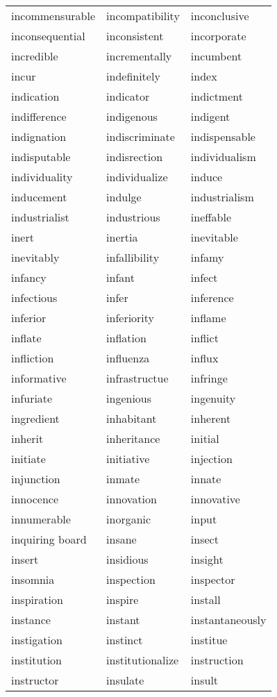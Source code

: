 \documentclass{minimal}
\begin{document}
\begin{longtable}{p{2.7cm}@{\hskip 0.2cm}p{2.7cm}@{\hskip 0.2cm}p{2.7cm}}
incommensurable & incompatibility & inconclusive \\
inconsequential & inconsistent & incorporate \\
incredible & incrementally & incumbent \\
incur & indefinitely & index \\
indication & indicator & indictment \\
indifference & indigenous & indigent \\
indignation & indiscriminate & indispensable \\
indisputable & indisrection & individualism \\
individuality & individualize & induce \\
inducement & indulge & industrialism \\
industrialist & industrious & ineffable \\
inert & inertia & inevitable \\
inevitably & infallibility & infamy \\
infancy & infant & infect \\
infectious & infer & inference \\
inferior & inferiority & inflame \\
inflate & inflation & inflict \\
infliction & influenza & influx \\
informative & infrastructue & infringe \\
infuriate & ingenious & ingenuity \\
ingredient & inhabitant & inherent \\
inherit & inheritance & initial \\
initiate & initiative & injection \\
injunction & inmate & innate \\
innocence & innovation & innovative \\
innumerable & inorganic & input \\
inquiring board & insane & insect \\
insert & insidious & insight \\
insomnia & inspection & inspector \\
inspiration & inspire & install \\
instance & instant & instantaneously \\
instigation & instinct & institue \\
institution & institutionalize & instruction \\
instructor & insulate & insult \\

\end{longtable}
\end{document}
